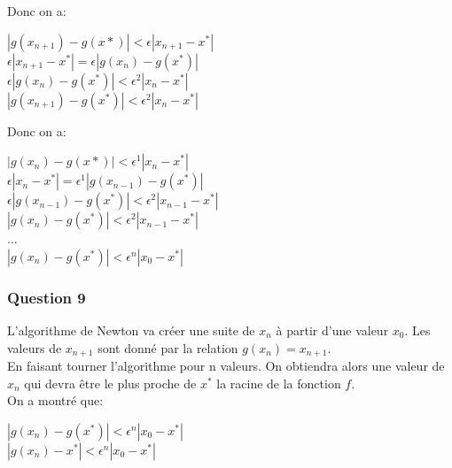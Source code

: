 \documentclass{article}
\begin{document}
	Donc on a:
	
	\begin{center}
		\begin{large}
			$|g(x_{n+1})-g(x*)| < \epsilon|x_{n+1}-x^{*}|$\\
			$\epsilon|x_{n+1}-x^{*}| = \epsilon|g(x_{n})-g(x^{*})|$\\
			$\epsilon|g(x_{n})-g(x^{*})| < \epsilon^{2}|x_{n}-x^{*}|$\\
			$|g(x_{n+1})-g(x^{*})| < \epsilon^{2}|x_{n}-x^{*}|$
		\end{large}
	\end{center}

	\newpage	
	
	Donc on a:
	
	\begin{center}
		\begin{large}
			$|g(x_{n})-g(x*)| < \epsilon^{1}|x_{n}-x^{*}|$\\
			$\epsilon|x_{n}-x^{*}| = \epsilon^{1}|g(x_{n-1})-g(x^{*})|$\\
			$\epsilon|g(x_{n-1})-g(x^{*})| < \epsilon^{2}|x_{n-1}-x^{*}|$\\
			$|g(x_{n})-g(x^{*})| < \epsilon^{2}|x_{n-1}-x^{*}|$\\
			...\\
			$|g(x_{n})-g(x^{*})| < \epsilon^{n}|x_{0}-x^{*}|$\\
		\end{large}
	\end{center}
	
	\subsubsection{Question 9}
	
	L'algorithme de Newton va créer une suite de $x_{n}$ à partir d'une valeur $x_{0}$. Les valeurs de $x_{n+1}$ sont
	donné par la relation $g(x_{n})=x_{n+1}$.\\
	
	En faisant tourner l'algorithme pour n valeurs. On obtiendra alors une valeur de $x_{n}$ qui devra être le plus proche de $x^{*}$ la racine de la fonction $f$.\\
	
	On a montré que:
	
	\begin{center}
		\begin{large}
			$|g(x_{n})-g(x^{*})| < \epsilon^{n}|x_{0}-x^{*}|$\\
			$|g(x_{n})-x^{*}| < \epsilon^{n}|x_{0}-x^{*}|$
		\end{large}
	\end{center}
	
\end{document}
